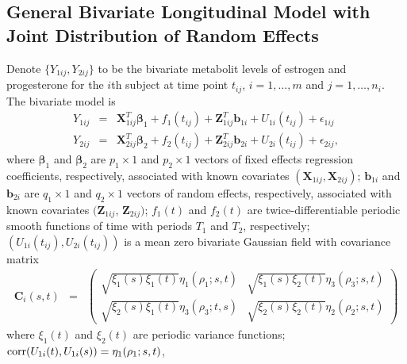 \documentclass[article,lineno]{biometrika}
\begin{document}
\subsection{General Bivariate Longitudinal Model with Joint Distribution of Random Effects}
Denote $\{Y_{1ij}, Y_{2ij}\}$ to be the bivariate metabolit levels of estrogen and progesterone for the $i$th subject at time point $t_{ij}$, 
$i = 1, \dots, m$ and $j = 1, \dots, n_i$. 
The bivariate model is
\begin{eqnarray} \label{biv}
Y_{1ij} 
&=& 
\bm{X}_{1ij}^T\bm{\beta}_1 + f_1(t_{ij}) + \bm{Z}_{1ij}^T
\bm{b}_{1i} + 
U_{1i}(t_{ij}) + 
\epsilon_{1ij}
 \nonumber 
\\
Y_{2ij} 
&=& 
\bm X_{2ij}^T \bm \beta_2 + f_2(t_{ij}) + \bm Z_{2ij}^T
\bm b_{2i} + 
U_{2i}(t_{ij}) + \epsilon_{2ij}, 
\end{eqnarray}
where 
$\bm \beta_1$ and $\bm \beta_2$ are $p_1 \times 1$ and $p_2 \times 1$ vectors of fixed effects regression coefficients, respectively, associated with known covariates $(\bm X_{1ij}, \bm X_{2ij})$; 
$\bm b_{1i}$ and $\bm b_{2i}$ are $q_1 \times 1$ and $q_2 \times 1$ vectors of random effects, respectively, associated with known covariates $(\bm Z_{1ij}$, $\bm Z_{2ij})$; 
$f_1(t)$ and $f_2(t)$ are  twice-differentiable periodic smooth functions of time with  periods $T_1$ and $T_2$, respectively; 
$(U_{1i}(t_{ij}), U_{2i}(t_{ij}))$ is a mean zero bivariate Gaussian field  with 
covariance matrix 
\begin{eqnarray*}
\boldsymbol C_i(s, t) &=&
  \begin{pmatrix}
 \sqrt {\xi_1(s) \xi_1(t)} \eta_1(\rho_1; s, t) &   \sqrt {\xi_1(s) \xi_2(t)} \eta_3(\rho_3; s, t)
  \\
 \sqrt {\xi_2(s) \xi_1(t)} \eta_3(\rho_3; t, s)
 &   \sqrt {\xi_2(s) \xi_2(t)} \eta_2(\rho_2; s, t)
 \end{pmatrix}
\end{eqnarray*}
where 
$\xi_1(t)$ and $\xi_2(t)$ are periodic variance functions;  
${\rm corr} (U_{1i}(t), U_{1i}(s)) = \eta_1(\rho_1; s, t)$,  \\
\end{document}
